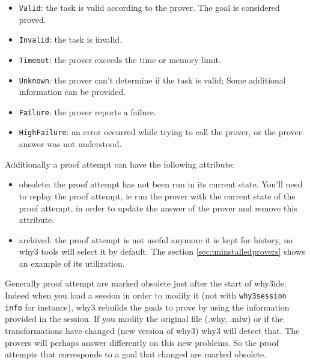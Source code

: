 \begin{itemize}
\item \texttt{Valid}: the task is valid according to the prover. The
  goal is considered proved.
\item \texttt{Invalid}: the task is invalid.
\item \texttt{Timeout}: the prover exceeds the time or memory limit.
\item \texttt{Unknown}: the prover can't determine if the task
  is valid; Some additional information can be provided.
\item \texttt{Failure}: the prover reports a failure.
\item \texttt{HighFailure}: an error occurred while trying to call the
  prover, or the prover answer was not understood.
\end{itemize}

Additionally a proof attempt can have the following attribute:

\begin{itemize}
\item obsolete: the proof attempt has not been run in
  its current state. You'll need to replay the proof attempt, ie run
  the prover with the current state of the proof attempt, in order to
  update the answer of the prover and remove this attribute.
\item archived: the proof attempt is not useful
  anymore it is kept for history, no why3 tools will select it by
  default. The section \ref{sec:uninstalledprovers} shows an example
  of its utilization.
\end{itemize}

Generally proof attempt are marked obsolete just after
the start of why3ide. Indeed when you load a session in order to
modify it (not with \texttt{why3session info} for instance), why3
rebuilds the goals to prove by using the information provided in the
session. If you modify the original file (.why, .mlw) or if the
transformations have changed (new version of why3) why3 will detect
that. The provers will perhaps answer differently on this new
problems. So the proof attempts that corresponds to a goal that
changed are marked obsolete. 



